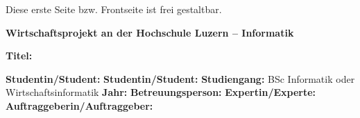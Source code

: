 
{\color{red}Diese erste Seite bzw. Frontseite ist frei gestaltbar.}
\newpage

\noindent
\fontsize{12}{14}
\textbf{Wirtschaftsprojekt an der Hochschule Luzern -- Informatik} \\ \vspace*{0.6cm}

\fontsize{10.5}{12}
\noindent
\textbf{Titel:} \\ \vspace*{0.2cm}

\noindent
\textbf{Studentin/Student:} \newline \newline
\textbf{Studentin/Student:} \newline \newline
\textbf{Studiengang:} BSc Informatik oder Wirtschaftsinformatik  \newline \newline
\textbf{Jahr:} \newline \newline
\textbf{Betreuungsperson:} \newline \newline
\textbf{Expertin/Experte:} \newline \newline
\textbf{Auftraggeberin/Auftraggeber:} \newline \newline \newline





